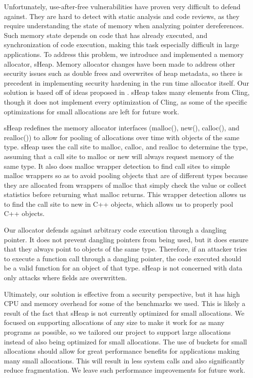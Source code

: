 \documentclass[conference]{IEEEtran}
\begin{document}
Unfortunately, use-after-free vulnerabilities have proven very difficult 
to defend against. They are hard to detect with static analysis and code 
reviews, as they require understanding the state of memory when analyzing 
pointer dereferences. Such memory state depends on code that has already 
executed, and synchronization of code execution, making this task 
especially difficult in large applications. To address this problem, we 
introduce and implemented a memory allocator, sHeap. Memory allocator 
changes have been made to address other security issues such as double 
frees and overwrites of heap metadata, so there is precedent in 
implementing security hardening in the run time allocator itself. Our 
solution is based off of ideas proposed in \cite{b1}. sHeap takes many 
elements from Cling, though it does not implement every optimization of 
Cling, as some of the specific optimizations for small allocations are 
left for future work. 

sHeap redefines the memory allocator interfaces (malloc(), new(), 
calloc(), and realloc()) to allow for pooling of allocations over time 
with objects of the same type. sHeap uses the call site to malloc, 
calloc, and realloc to determine the type, assuming that a call site to 
malloc or new will always request memory of the same type. It also does 
malloc wrapper detection to find call sites to simple malloc wrappers so 
as to avoid pooling objects that are of different types because they are 
allocated from wrappers of malloc that simply check the value or collect 
statistics before returning what malloc returns. This wrapper detection 
allows us to find the call site to new in C++ objects, which allows us 
to properly pool C++ objects. 

Our allocator defends against arbitrary code execution through a dangling 
pointer.  It does not prevent dangling pointers from being used, but it 
does ensure that they always point to objects of the same type. Therefore, 
if an attacker tries to execute a function call through a dangling 
pointer, the code executed should be a valid function for an object of 
that type.  sHeap is not concerned with data only attacks where fields 
are overwritten. 

Ultimately, our solution is effective from a security perspective, but it 
has high CPU and memory overhead for some of the benchmarks we used. This 
is likely a result of the fact that sHeap is not currently optimized for 
small allocations.  We focused on supporting allocations of any size to 
make it work for as many programs as possible, so we tailored our project 
to support large allocations instead of also being optimized for small 
allocations.  The use of buckets for small allocations should allow for 
great performance benefits for applications making many small allocations. 
This will result in less system calls and also significantly reduce 
fragmentation. We leave such performance improvements for future work.
\end{document}

